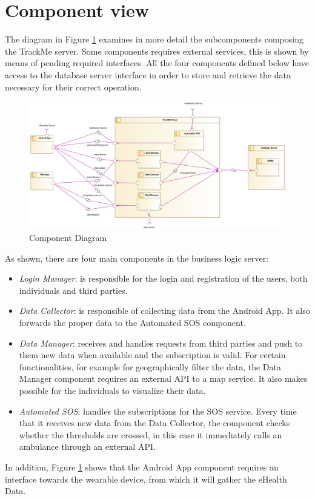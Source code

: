 \section{Component view}
The diagram in Figure \ref{f:comp_diag} examines in more detail the subcomponents composing the TrackMe server.
Some components requires external services, this is shown by means of pending required interfaces.
All the four components defined below have access to the database server interface in order to store and retrieve the data necessary for their correct operation.

\begin{figure}[H]
\centering
\includegraphics[width=\linewidth]{resources/uml/compdiag}
\caption{Component Diagram}\label{f:comp_diag}
\end{figure}

\noindent
As shown, there are four main components in the business logic server:

\begin{itemize}
\item \textit{Login Manager}: is responsible for the login and registration of the users, both individuals and third parties.
\item \textit{Data Collector}: is responsible of collecting data from the Android App. 
It also forwards the proper data to the Automated SOS component.

\item \textit{Data Manager}: receives and handles requests from third parties and push to them new data when available and the subscription is valid.
For certain functionalities, for example for geographically filter the data, the Data Manager component requires an external API to a map service.
It also makes possible for the individuals to visualize their data.

\item \textit{Automated SOS}: handles the subscriptions for the SOS service. 
Every time that it receives new data from the Data Collector, the component checks whether the thresholds are crossed, in this case it immediately calls an ambulance through an external API.
\end{itemize}
In addition, Figure \ref{f:comp_diag} shows that the Android App component requires an interface towards the wearable device, from which it will gather the eHealth Data.




